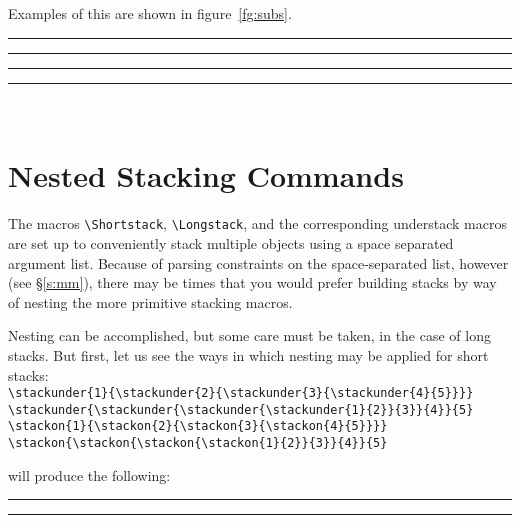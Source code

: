 \documentclass{article}
\def\rl{\rule[-.3pt]{2ex}{.6pt}}
\let\vb\verb
\def\blmark{\rl\stackengine{-.9ex}{B}{\rule{.35ex}{0pt}L}{U}{l}{F}{T}{S}\rl}
\begin{document}
Examples of this are shown in figure~\ref{fg:subs}. 

%
%
\begin{myverbbox}{\figa}\end{myverbbox}%
\begin{myverbbox}{\figb}\end{myverbbox}%
\begin{myverbbox}[\small]{\figc}
\end{myverbbox}%
\begin{myverbbox}%
{\figd}\end{myverbbox}%
\def\CaptionJustification{\raggedright}%
{\blmark\rl\rl%
~~
~~
~~
}%

\section{Nested Stacking Commands\label{s:nsc}}

The macros \vb|\Shortstack|, \vb|\Longstack|, and the corresponding
understack macros are set up to conveniently stack multiple objects
using a space separated argument list.  Because of parsing constraints
on the space-separated list, however (see \S\ref{s:mm}), there may be
times that you would prefer building stacks by way of nesting the more
primitive stacking macros.

Nesting can be accomplished, but some care must be taken, in the case of
long stacks.  But first, let us see the ways in which nesting may be
applied for short stacks:\\

\def\stacktype{S}
\vb|\stackunder{1}{\stackunder{2}{\stackunder{3}{\stackunder{4}{5}}}}|\\
\vb|\stackunder{\stackunder{\stackunder{\stackunder{1}{2}}{3}}{4}}{5}|\\
\vb|\stackon{1}{\stackon{2}{\stackon{3}{\stackon{4}{5}}}}|\\
\vb|\stackon{\stackon{\stackon{\stackon{1}{2}}{3}}{4}}{5}|

will produce the following: 
 \blmark
\end{document}

